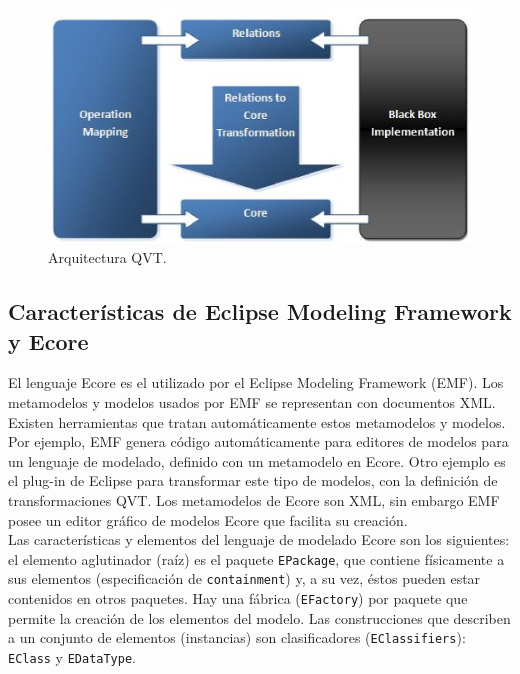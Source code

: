 \begin{figure}[!h] 
\begin{center}
 \includegraphics [scale=0.75]{imagenes/qvt.eps}
\end{center}
\caption{Arquitectura QVT.}
\label{fig:qvt}
\end{figure} 

\subsection*{Características de Eclipse Modeling Framework y Ecore}

El lenguaje Ecore es el utilizado por el Eclipse Modeling Framework (EMF). Los metamodelos y modelos usados por EMF se representan con documentos XML. Existen herramientas que tratan automáticamente estos metamodelos y modelos. Por ejemplo, EMF ge\-ne\-ra código automáticamente para editores de modelos para un lenguaje de mode\-lado, definido con un metamodelo en Ecore. Otro ejemplo es el plug-in de Eclipse para transformar este tipo de modelos, con la definición de transformaciones QVT. Los metamodelos de Ecore son XML, sin embargo EMF posee un editor gráfico de modelos Ecore que facilita su creación.\\

Las características y elementos del lenguaje de modelado Ecore son los sigui\-entes: el elemento aglutinador (raíz) es el paquete \texttt{EPackage}, que contiene físicamente a sus elementos (especificación de
\texttt{containment}) y, a su vez, éstos pueden estar contenidos en otros paquetes. Hay una fábrica (\texttt{EFactory}) por paquete que permite la creación de los elementos del modelo. Las construcciones que describen a un conjunto de elementos (instancias) son clasificadores (\texttt{EClassifiers}): \texttt{EClass} y \texttt{EDataType}.\\


